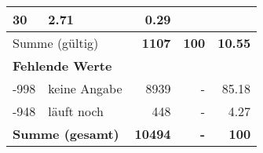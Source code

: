 \begin{longtable}{lXrrr}
       \num{30} &
       \num[round-mode=places,round-precision=2]{2,71} &
         \num[round-mode=places,round-precision=2]{0,29} \\
     \midrule
     \multicolumn{2}{l}{Summe (gültig)} &
       \textbf{\num{1107}} &
     \textbf{100} &
       \textbf{\num[round-mode=places,round-precision=2]{10,55}} \\
     \multicolumn{5}{l}{\textbf{Fehlende Werte}}\\
       -998 &
       keine Angabe &
         \num{8939} &
        - &
         \num[round-mode=places,round-precision=2]{85,18} \\
       -948 &
       läuft noch &
         \num{448} &
        - &
         \num[round-mode=places,round-precision=2]{4,27} \\
     \midrule
     \multicolumn{2}{l}{\textbf{Summe (gesamt)}} &
          \textbf{\num{10494}} &
        \textbf{-} &
        \textbf{100} \\
     \bottomrule
     \end{longtable}
     
